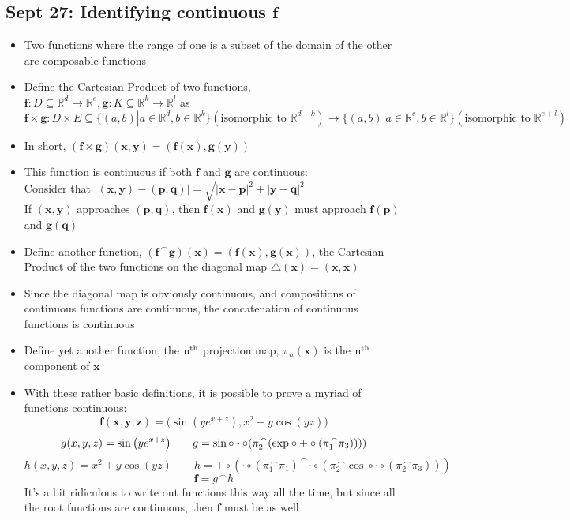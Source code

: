 \documentclass[10pt, oneside]{article}
\newcommand{\cat}{^{\,\smallfrown}}
\newcommand{\R}{\mathbb{R}}
\newcommand{\Cdot}{\boldsymbol{\cdot}}
\renewcommand{\vec}[1]{\mathbf{#1}}
\newcommand{\vecf}[1]{\boldsymbol{#1}}
\begin{document}
\subsection{Sept 27: Identifying continuous $\vecf{f}$}
\begin{itemize}
    \item Two functions where the range of one is a subset of the domain of the other are composable functions
    \item Define the Cartesian Product of two functions, $\vecf{f} : D \subseteq \R^d \rightarrow \R^e, \vecf{g} : K \subseteq \R^k \rightarrow \R^l$ as $\vec{f} \times \vecf{g} : D \times E \subseteq \{(a,b) | a \in \R^d, b \in \R^k\} (\text{isomorphic to } \R^{d+k}) \rightarrow \{(a,b) | a \in \R^e, b \in \R^l\} (\text{isomorphic to } \R^{e+l})$
    \item In short, $(\vecf{f} \times \vecf{g})(\vec{x},\vec{y}) = (\vecf{f}(\vec{x}),\vecf{g}(\vec{y}))$
    \item This function is continuous if both $\vec{f}$ and $\vecf{g}$ are continuous:\\
        Consider that $|(\vec{x},\vec{y}) - (\vec{p},\vec{q})| = \sqrt{|\vec{x} - \vec{p}|^2 + |\vec{y} - \vec{q}|^2}$\\
        If $(\vec{x},\vec{y})$ approaches $(\vec{p},\vec{q})$, then $\vecf{f}(\vec{x})$ and  $\vecf{g}(\vec{y})$ must approach $\vecf{f}(\vec{p})$ and $\vecf{g}(\vec{q})$
    \item Define another function, $(\vecf{f} \cat \vecf{g})(\vec{x}) = (\vecf{f}(\vec{x}),\vecf{g}(\vec{x}))$, the Cartesian Product of the two functions on the diagonal map $\bigtriangleup (\vec{x}) = (\vec{x},\vec{x})$
    \item Since the diagonal map is obviously continuous, and compositions of continuous functions are continuous, the concatenation of continuous functions is continuous
    \item Define yet another function, the $\rm{n^{th}}$ projection map, $\pi_n(\vec{x})$ is the $\rm{n^{th}}$ component of $\vec{x}$
    \item With these rather basic definitions, it is possible to prove a myriad of functions continuous:
        \[\vecf{f}(\vec{x},\vec{y},\vec{z}) = \big( \sin (y e^{x + z}) , x^2 + y \cos (yz) \big)\]
        \[g(x,y,z) = \sin \big( y e^{x + z} \big) \quad \quad g = \sin \circ \Cdot \circ (\pi_2 \cat ( \rm{exp} \circ + \circ (\pi_1 \cat \pi_3))))\]
        \[h(x,y,z) = x^2 + y \cos (yz) \quad \quad h = + \circ (\Cdot \circ (\pi_1 \cat \pi_1) \cat \Cdot \circ ( \pi_2 \cat \cos \circ \Cdot \circ (\pi_2 \cat \pi_3)))\]
        \[\vecf{f} = g \cat h\]
    It's a bit ridiculous to write out functions this way all the time, but since all the root functions are continuous, then $\vecf{f}$ must be as well
\end{itemize}
\end{document}
